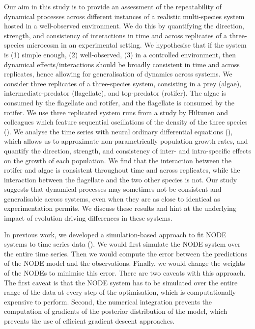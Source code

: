 \documentclass[11pt, oneside]{article}
\begin{document}
Our aim in this study is to provide an assessment of the repeatability of dynamical processes across different instances of a realistic multi-species system hosted in a well-observed environment.
We do this by quantifying the direction, strength, and consistency of interactions in time and across replicates of a three-species microcosm in an experimental setting.
We hypothesise that if the system is (1) simple enough, (2) well-observed, (3) in a controlled environment, then dynamical effects/interactions should be broadly consistent in time and across replicates, hence allowing for generalisation of dynamics across systems. 
We consider three replicates of a three-species system, consisting in a prey (algae), intermediate-predator (flagellate), and top-predator (rotifer).
The algae is consumed by the flagellate and rotifer, and the flagellate is consumed by the rotifer.
We use three replicated system runs from a study by Hiltunen and colleagues which feature sequential oscillations of the density of the three species (\cite{Hiltunen2013}).
We analyse the time series with neural ordinary differential equations (\cite{Bonnaffe2021a}), which allows us to approximate non-parametrically population growth rates, and quantify the direction, strength, and consistency of inter- and intra-specific effects on the growth of each population.
We find that the interaction between the rotifer and algae is consistent throughout time and across replicates, while the interaction between the flagellate and the two other species is not.
Our study suggests that dynamical processes may sometimes not be consistent and generalisable across systems, even when they are as close to identical as experimentation permits. %
We discuss these results and hint at the underlying impact of evolution driving differences in these systems.

In previous work, we developed a simulation-based approach to fit NODE systems to time series data (\cite{Bonnaffe2021a}).
We would first simulate the NODE system over the entire time series.
Then we would compute the error between the predictions of the NODE model and the observations. 
Finally, we would change the weights of the NODEs to minimise this error. 
There are two caveats with this approach.
The first caveat is that the NODE system has to be simulated over the entire range of the data at every step of the optimisation, which is computationally expensive to perform.
Second, the numerical integration prevents the computation of gradients of the posterior distribution of the model, which prevents the use of efficient gradient descent approaches.
\end{document}
